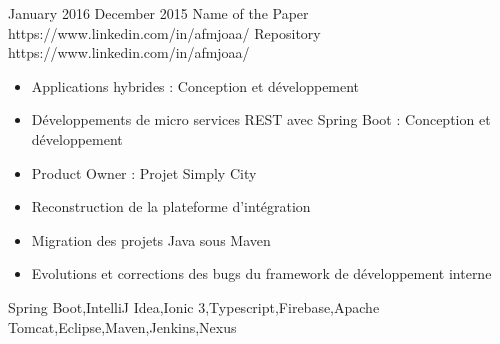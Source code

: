 
\horizontalLine
\begin{universalList}
  \universalListItem
    {January 2016}
    {December 2015}
    {Name of the Paper}
    {https://www.linkedin.com/in/afmjoaa/}
    {Repository}
    {https://www.linkedin.com/in/afmjoaa/}
    {
      \begin{itemize}
        \item Applications hybrides : Conception et développement
        \item Développements de micro services REST avec Spring Boot : Conception et développement
        \item Product Owner : Projet Simply City
        \item Reconstruction de la plateforme d'intégration
        \item Migration des projets Java sous Maven
        \item Evolutions et corrections des bugs du framework de développement interne
      \end{itemize}
    }
    {Spring Boot,IntelliJ Idea,Ionic 3,Typescript,Firebase,Apache Tomcat,Eclipse,Maven,Jenkins,Nexus}
\end{universalList}%